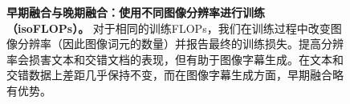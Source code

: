 \begin{figure}[t!]
    \centering
    \captionsetup{type=figure}
    \begin{subfigure}[t]{0.48\linewidth}
        
    \end{subfigure}
    \begin{subfigure}[t]{0.48\linewidth}
        
    \end{subfigure}
    \vspace{-7pt}
    \caption{\textbf{早期融合与晚期融合：使用不同图像分辨率进行训练（isoFLOPs）。} 对于相同的训练FLOPs，我们在训练过程中改变图像分辨率（因此图像词元的数量）并报告最终的训练损失。提高分辨率会损害文本和交错文档的表现，但有助于图像字幕生成。在文本和交错数据上差距几乎保持不变，而在图像字幕生成方面，早期融合略有优势。}
    \label{fig:early_vs_late_imageres}
\end{figure}
